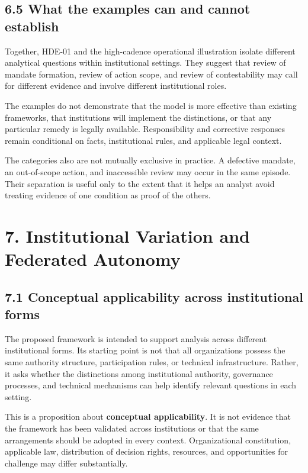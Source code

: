 \documentclass[
  10pt,
]{article}
\begin{document}
\subsection{6.5 What the examples can and cannot
establish}\label{what-the-examples-can-and-cannot-establish}

Together, HDE-01 and the high-cadence operational illustration isolate
different analytical questions within institutional settings. They
suggest that review of mandate formation, review of action scope, and
review of contestability may call for different evidence and involve
different institutional roles.

The examples do not demonstrate that the model is more effective than
existing frameworks, that institutions will implement the distinctions,
or that any particular remedy is legally available. Responsibility and
corrective responses remain conditional on facts, institutional rules,
and applicable legal context.

The categories also are not mutually exclusive in practice. A defective
mandate, an out-of-scope action, and inaccessible review may occur in
the same episode. Their separation is useful only to the extent that it
helps an analyst avoid treating evidence of one condition as proof of
the others.

\section{7. Institutional Variation and Federated
Autonomy}\label{institutional-variation-and-federated-autonomy}

\subsection{7.1 Conceptual applicability across institutional
forms}\label{conceptual-applicability-across-institutional-forms}

The proposed framework is intended to support analysis across different
institutional forms. Its starting point is not that all organizations
possess the same authority structure, participation rules, or technical
infrastructure. Rather, it asks whether the distinctions among
institutional authority, governance processes, and technical mechanisms
can help identify relevant questions in each setting.

This is a proposition about \textbf{conceptual applicability}. It is not
evidence that the framework has been validated across institutions or
that the same arrangements should be adopted in every context.
Organizational constitution, applicable law, distribution of decision
rights, resources, and opportunities for challenge may differ
substantially.
\end{document}
